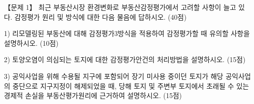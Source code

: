 \begin{longquestion}{【문제 1】}
최근 부동산시장 환경변화로 부동산감정평가에서 고려할 사항이 늘고 있다. 감정평가 원리 및 방식에 대한 다음 물음에 답하시오. (40점) \par
1) 리모델링된 부동산에 대해 감정평가3방식을 적용하여 감정평가할 때 유의할 사항을 설명하시오. (10점) \par
2) 토양오염이 의심되는 토지에 대한 감정평가안건의 처리방법을 설명하시오. (15점) \par
3) 공익사업을 위해 수용될 지구에 포함되어 장기 미사용 중이던 토지가 해당 공익사업의 중단으로 지구지정이 해제되었을 때, 당해 토지 및 주변부 토지에서 초래될 수 있는 경제적 손실을 부동산평가원리에 근거하여 설명하시오. (15점) \par
\end{longquestion}
